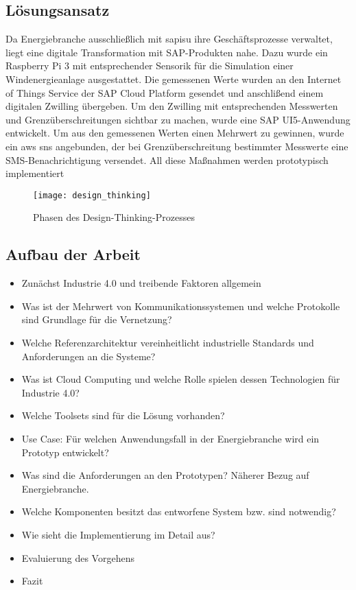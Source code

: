 \subsection{Lösungsansatz}

Da Energiebranche ausschließlich mit \acf{sapisu} ihre Geschäftsprozesse verwaltet, liegt eine digitale Transformation
mit SAP-Produkten nahe. Dazu wurde ein Raspberry Pi 3 mit entsprechender Sensorik für die Simulation einer Windenergieanlage
ausgestattet. Die gemessenen Werte wurden an den Internet of Things Service der SAP Cloud Platform gesendet und anschlißend
einem digitalen Zwilling übergeben. Um den Zwilling mit entsprechenden Messwerten und Grenzüberschreitungen
sichtbar zu machen, wurde eine SAP UI5-Anwendung entwickelt. Um aus den gemessenen Werten einen Mehrwert zu gewinnen,
wurde ein \acf{aws} \acf{sns} angebunden, der bei Grenzüberschreitung bestimmter Messwerte eine
SMS-Benachrichtigung versendet. All diese Maßnahmen werden prototypisch implementiert

\begin{figure}[ht]
  \centering
  \texttt{[image: design\_thinking]}
  \caption[Phasen des Design-Thinking-Prozesses]{Phasen des Design-Thinking-Prozesses \citep[S. 69]{Elsner2018}}
  \label{}
\end{figure}

\subsection{Aufbau der Arbeit}



\begin{itemize}
  \item Zunächst Industrie 4.0 und treibende Faktoren allgemein
  \item Was ist der Mehrwert von Kommunikationssystemen und welche Protokolle sind Grundlage für die Vernetzung?
  \item Welche Referenzarchitektur vereinheitlicht industrielle Standards und Anforderungen an die Systeme?
  \item Was ist Cloud Computing und welche Rolle spielen dessen Technologien für Industrie 4.0?
  \item Welche Toolsets sind für die Lösung vorhanden?
  \item Use Case: Für welchen Anwendungsfall in der Energiebranche wird ein Prototyp entwickelt?
  \item Was sind die Anforderungen an den Prototypen? Näherer Bezug auf Energiebranche.
  \item Welche Komponenten besitzt das entworfene System bzw. sind notwendig?
  \item Wie sieht die Implementierung im Detail aus?
  \item Evaluierung des Vorgehens
  \item Fazit
\end{itemize}



\newpage
